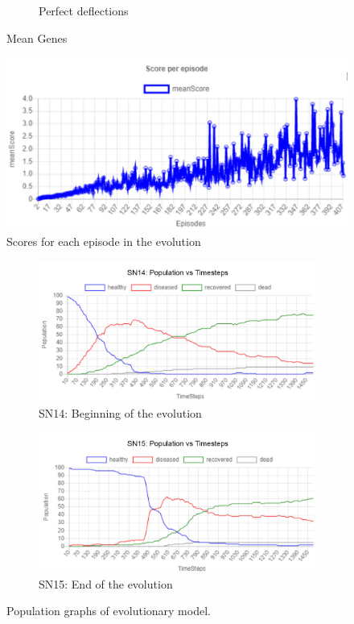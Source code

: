 \documentclass[a4paper,11pt]{article}
\begin{document}
\begin{figure}[h]
\begin{subfigure}[b]{0.33\linewidth}
            \caption{Perfect deflections}
            \label{fig:4.2c}
        \end{subfigure}
        \caption{Mean Genes}
        \label{fig:4.2}
    \end{figure}

    \begin{figure}[ht]
        \centering
        \includegraphics[width=0.5\linewidth]{diagrams/score_plot.jpg}
        \caption{Scores for each episode in the evolution}
        \label{fig:4.3}
    \end{figure}

    \begin{figure}[H]
        \centering
        \begin{subfigure}[b]{0.49\linewidth}
            \includegraphics[width=\linewidth]{pop_graphs/SN14_pop.jpg}
            \caption{SN14: Beginning of the evolution}
            \label{fig:SN14}
        \end{subfigure}
        \begin{subfigure}[b]{0.49\linewidth}
            \includegraphics[width=\linewidth]{pop_graphs/SN15_pop.jpg}
            \caption{SN15: End of the evolution}
            \label{fig:SN15}
        \end{subfigure}
        \caption{Population graphs of evolutionary model.}
    \end{figure}
\end{document}

